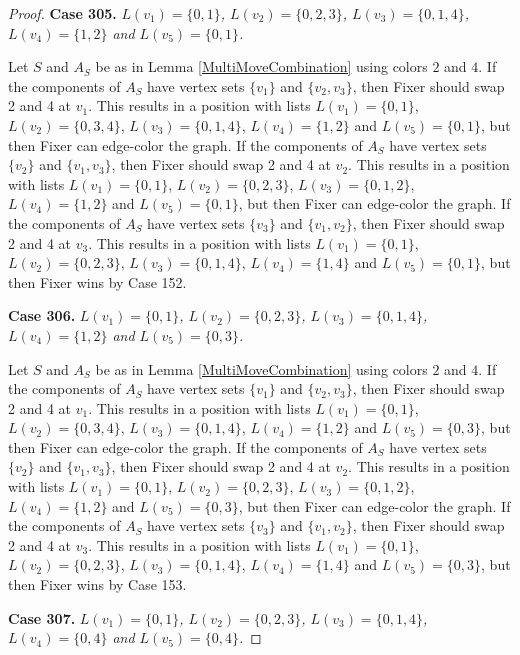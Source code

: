 \documentclass[12pt]{amsart}
\theoremstyle{plain}
\theoremstyle{definition}
\theoremstyle{remark}
\begin{document}
\begin{proof}
\noindent\textbf{Case 305.  }\textit{$L(v_1) = \{0, 1\}$, $L(v_2) = \{0, 2, 3\}$, $L(v_3) = \{0, 1, 4\}$, $L(v_4) = \{1, 2\}$ and $L(v_5) = \{0, 1\}$.}

Let $S$ and $A_S$ be as in Lemma \ref{MultiMoveCombination} using colors $2$ and $4$. If the components of $A_S$ have vertex sets $\{v_1\}$ and $\{v_2, v_3\}$, then Fixer should swap 2 and 4 at $v_1$. This results in a position with lists $L(v_1) = \{0, 1\}$, $L(v_2) = \{0, 3, 4\}$, $L(v_3) = \{0, 1, 4\}$, $L(v_4) = \{1, 2\}$ and $L(v_5) = \{0, 1\}$, but then Fixer can edge-color the graph. If the components of $A_S$ have vertex sets $\{v_2\}$ and $\{v_1, v_3\}$, then Fixer should swap 2 and 4 at $v_2$. This results in a position with lists $L(v_1) = \{0, 1\}$, $L(v_2) = \{0, 2, 3\}$, $L(v_3) = \{0, 1, 2\}$, $L(v_4) = \{1, 2\}$ and $L(v_5) = \{0, 1\}$, but then Fixer can edge-color the graph. If the components of $A_S$ have vertex sets $\{v_3\}$ and $\{v_1, v_2\}$, then Fixer should swap 2 and 4 at $v_3$. This results in a position with lists $L(v_1) = \{0, 1\}$, $L(v_2) = \{0, 2, 3\}$, $L(v_3) = \{0, 1, 4\}$, $L(v_4) = \{1, 4\}$ and $L(v_5) = \{0, 1\}$, but then Fixer wins by Case 152. 

\noindent\textbf{Case 306.  }\textit{$L(v_1) = \{0, 1\}$, $L(v_2) = \{0, 2, 3\}$, $L(v_3) = \{0, 1, 4\}$, $L(v_4) = \{1, 2\}$ and $L(v_5) = \{0, 3\}$.}

Let $S$ and $A_S$ be as in Lemma \ref{MultiMoveCombination} using colors $2$ and $4$. If the components of $A_S$ have vertex sets $\{v_1\}$ and $\{v_2, v_3\}$, then Fixer should swap 2 and 4 at $v_1$. This results in a position with lists $L(v_1) = \{0, 1\}$, $L(v_2) = \{0, 3, 4\}$, $L(v_3) = \{0, 1, 4\}$, $L(v_4) = \{1, 2\}$ and $L(v_5) = \{0, 3\}$, but then Fixer can edge-color the graph. If the components of $A_S$ have vertex sets $\{v_2\}$ and $\{v_1, v_3\}$, then Fixer should swap 2 and 4 at $v_2$. This results in a position with lists $L(v_1) = \{0, 1\}$, $L(v_2) = \{0, 2, 3\}$, $L(v_3) = \{0, 1, 2\}$, $L(v_4) = \{1, 2\}$ and $L(v_5) = \{0, 3\}$, but then Fixer can edge-color the graph. If the components of $A_S$ have vertex sets $\{v_3\}$ and $\{v_1, v_2\}$, then Fixer should swap 2 and 4 at $v_3$. This results in a position with lists $L(v_1) = \{0, 1\}$, $L(v_2) = \{0, 2, 3\}$, $L(v_3) = \{0, 1, 4\}$, $L(v_4) = \{1, 4\}$ and $L(v_5) = \{0, 3\}$, but then Fixer wins by Case 153. 

\noindent\textbf{Case 307.  }\textit{$L(v_1) = \{0, 1\}$, $L(v_2) = \{0, 2, 3\}$, $L(v_3) = \{0, 1, 4\}$, $L(v_4) = \{0, 4\}$ and $L(v_5) = \{0, 4\}$.}


\end{proof}
\end{document}
